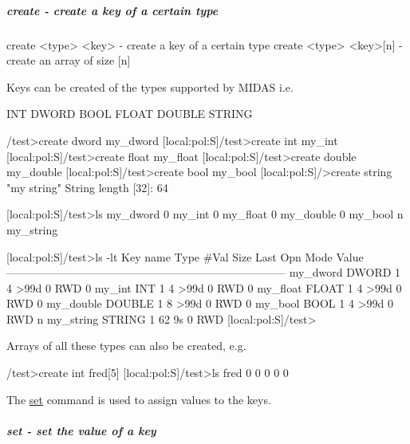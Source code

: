 \hypertarget{RC_odbedit_examples_RC_odbedit_cr}{}\subparagraph{create -\/ create a key of a certain type}\label{RC_odbedit_examples_RC_odbedit_cr}

\begin{DoxyCode}
create <type> <key>     - create a key of a certain type
create <type> <key>[n]  - create an array of size [n]
\end{DoxyCode}


Keys can be created of the types supported by MIDAS i.e. \par
 INT DWORD BOOL FLOAT DOUBLE STRING


\begin{DoxyCode}
/test>create dword my_dword
[local:pol:S]/test>create int my_int
[local:pol:S]/test>create float my_float
[local:pol:S]/test>create double my_double
[local:pol:S]/test>create bool my_bool
[local:pol:S]/>create string "my string"
String length [32]: 64

[local:pol:S]/test>ls
my_dword                        0
my_int                          0
my_float                        0
my_double                       0
my_bool                         n
my_string

[local:pol:S]/test>ls -lt
Key name                        Type    #Val  Size  Last Opn Mode Value
---------------------------------------------------------------------------
my_dword                        DWORD   1     4     >99d 0   RWD  0
my_int                          INT     1     4     >99d 0   RWD  0
my_float                        FLOAT   1     4     >99d 0   RWD  0
my_double                       DOUBLE  1     8     >99d 0   RWD  0
my_bool                         BOOL    1     4     >99d 0   RWD  n
my_string                       STRING  1     62    9s   0   RWD
[local:pol:S]/test>
\end{DoxyCode}


Arrays of all these types can also be created, e.g. 
\begin{DoxyCode}
/test>create int fred[5]
[local:pol:S]/test>ls
fred
                                0
                                0
                                0
                                0
                                0
\end{DoxyCode}


The \hyperlink{RC_odbedit_examples_RC_odbedit_set}{set} command is used to assign values to the keys.



\hypertarget{RC_odbedit_examples_RC_odbedit_set}{}\subparagraph{set -\/ set the value of a key}\label{RC_odbedit_examples_RC_odbedit_set}

